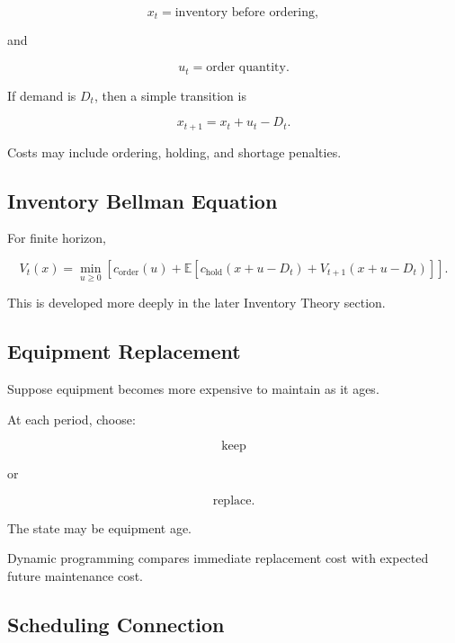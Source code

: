 \[
x_t
=
\text{inventory before ordering},
\]

and

\[
u_t
=
\text{order quantity}.
\]

If demand is \(D_t\), then a simple transition is

\[
\boxed{
x_{t+1}
=
x_t
+
u_t
-
D_t.
}
\]

Costs may include ordering, holding, and shortage penalties.

\subsection{Inventory Bellman Equation}
\label{subsec:inventory-bellman}

For finite horizon,

\[
\boxed{
V_t(x)
=
\min_{u\geq0}
\left[
c_{\mathrm{order}}(u)
+
\mathbb{E}
\left[
c_{\mathrm{hold}}
(
x+u-D_t
)
+
V_{t+1}
(
x+u-D_t
)
\right]
\right].
}
\]

This is developed more deeply in the later Inventory Theory section.

\subsection{Equipment Replacement}
\label{subsec:equipment-replacement-dp}

Suppose equipment becomes more expensive to maintain as it ages.

At each period, choose:

\[
\boxed{
\text{keep}
}
\]

or

\[
\boxed{
\text{replace}.
}
\]

The state may be equipment age.

Dynamic programming compares immediate replacement cost with expected
future maintenance cost.

\subsection{Scheduling Connection}
\label{subsec:scheduling-dp-connection}

